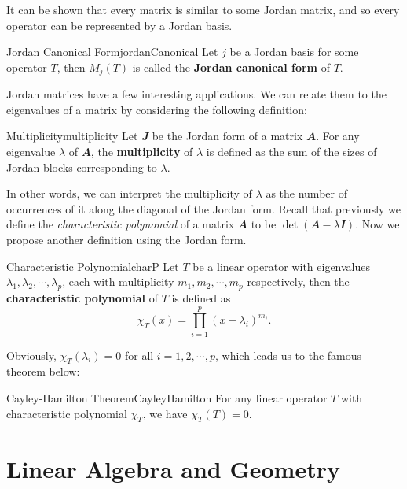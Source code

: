 \documentclass[math, code]{amznotes}
\theoremstyle{remark}
\begin{document}
It can be shown that every matrix is similar to some Jordan matrix, and so every operator can be represented by a Jordan basis.
\begin{dfnbox}{Jordan Canonical Form}{jordanCanonical}
    Let $j$ be a Jordan basis for some operator $T$, then $M_j(T)$ is called the {\color{red} \textbf{Jordan canonical form}} of $T$.
\end{dfnbox}
Jordan matrices have a few interesting applications. We can relate them to the eigenvalues of a matrix by considering the following definition:
\begin{dfnbox}{Multiplicity}{multiplicity}
    Let $\mathbfit{J}$ be the Jordan form of a matrix $\mathbfit{A}$. For any eigenvalue $\lambda$ of $\mathbfit{A}$, the {\color{red} \textbf{multiplicity}} of $\lambda$ is defined as the sum of the sizes of Jordan blocks corresponding to $\lambda$.
\end{dfnbox}
In other words, we can interpret the multiplicity of $\lambda$ as the number of occurrences of it along the diagonal of the Jordan form. Recall that previously we define the \textit{characteristic polynomial} of a matrix $\mathbfit{A}$ to be $\det(\mathbfit{A} - \lambda\mathbfit{I})$. Now we propose another definition using the Jordan form.
\begin{dfnbox}{Characteristic Polynomial}{charP}
    Let $T$ be a linear operator with eigenvalues $\lambda_1, \lambda_2, \cdots, \lambda_p$, each with multiplicity $m_1, m_2, \cdots, m_p$ respectively, then the {\color{red} \textbf{characteristic polynomial}} of $T$ is defined as 
    \begin{equation*}
        \chi_T(x) = \prod_{i = 1}^{p}(x - \lambda_i)^{m_i}.
    \end{equation*}
\end{dfnbox}
Obviously, $\chi_T(\lambda_i) = 0$ for all $i = 1, 2, \cdots, p$, which leads us to the famous theorem below:
\begin{thmbox}{Cayley-Hamilton Theorem}{CayleyHamilton}
    For any linear operator $T$ with characteristic polynomial $\chi_T$, we have $\chi_T(T) = 0$.
\end{thmbox}
\chapter{Linear Algebra and Geometry}
\end{document}
